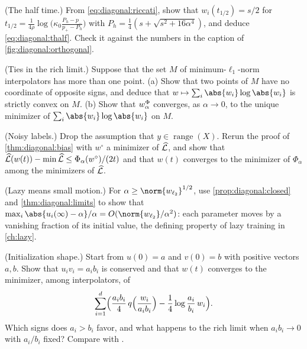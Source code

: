 \begin{refsection}
\begin{exercises}
\item \consolidation (The half time.) From \eqref{eq:diagonal:riccati}, show that $w_i(t_{1/2})=s/2$ for $t_{1/2}=\frac1{4\rho}\log\bigl(\kappa_0\frac{P_h-p_-}{p_+-P_h}\bigr)$ with $P_h=\frac14(s+\sqrt{s^2+16\alpha^4})$, and deduce \eqref{eq:diagonal:thalf}. Check it against the numbers in the caption of \cref{fig:diagonal:orthogonal}. \label{ex:diagonal:half}

\item \consolidation\hard (Ties in the rich limit.) Suppose that the set $M$ of minimum-$\ell_1$-norm interpolators has more than one point. (a) Show that two points of $M$ have no coordinate of opposite signs, and deduce that $w\mapsto\sum_i\abs{w_i}\log\abs{w_i}$ is strictly convex on $M$. (b) Show that $w^\Phi_\alpha$ converges, as $\alpha\to0$, to the unique minimizer of $\sum_i\abs{w_i}\log\abs{w_i}$ on $M$. \label{ex:diagonal:tie}

\item \consolidation (Noisy labels.) Drop the assumption that $y\in\operatorname{range}(X)$. Rerun the proof of \cref{thm:diagonal:bias} with $w^\circ$ a minimizer of $\widehat{\mathcal{L}}$, and show that $\widehat{\mathcal{L}}(w(t))-\min\widehat{\mathcal{L}}\le\Phi_\alpha(w^\circ)/(2t)$ and that $w(t)$ converges to the minimizer of $\Phi_\alpha$ among the minimizers of $\widehat{\mathcal{L}}$. \label{ex:diagonal:noisy}

\item \consolidation (Lazy means small motion.) For $\alpha\ge\norm{\diagwl2}^{1/2}$, use \cref{prop:diagonal:closed} and \cref{thm:diagonal:limits} to show that $\max_i\abs{u_i(\infty)-\alpha}/\alpha=O(\norm{\diagwl2}/\alpha^2)$: each parameter moves by a vanishing fraction of its initial value, the defining property of lazy training in \cref{ch:lazy}. \label{ex:diagonal:lazy}

\item \variation (Initialization shape.) Start from $u(0)=a$ and $v(0)=b$ with positive vectors $a,b$. Show that $u_iv_i=a_ib_i$ is conserved and that $w(t)$ converges to the minimizer, among interpolators, of
\[
  \sum_{i=1}^d\Bigl(\frac{a_ib_i}4\,q\Bigl(\frac{w_i}{a_ib_i}\Bigr)-\frac14\log\frac{a_i}{b_i}\,w_i\Bigr).
\]
Which signs does $a_i>b_i$ favor, and what happens to the rich limit when $a_ib_i\to0$ with $a_i/b_i$ fixed? Compare with \textcite{AzulayEtAl2021}. \label{ex:diagonal:shape}


\end{exercises}
\end{refsection}
